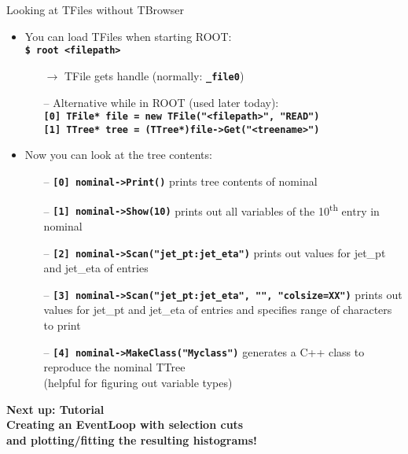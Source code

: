 \documentclass[10pt, aspectratio=169]{beamer}
\begin{document}
\begin{frame}{Looking at TFiles without TBrowser}
  \begin{itemize}
    \item
      You can load TFiles when starting ROOT: \\ \textbf{\texttt{\$ root <filepath>}}
    \begin{itemize}
      \item[$\rightarrow$] TFile gets handle (normally: \textbf{\texttt{\_file0}})
      \item[--] Alternative while in ROOT (used later today): \\ \textbf{\texttt{[0] TFile* file = new TFile("<filepath>", "READ")}} \\ \textbf{\texttt{[1] TTree* tree = (TTree*)file->Get("<treename>")}}
      
    \end{itemize}
    \item
      Now you can look at the tree contents:
    \begin{itemize}
      \item[--] \textbf{\texttt{[0] nominal->Print()}} prints tree contents of nominal
      \item[--] \textbf{\texttt{[1] nominal->Show(10)}} prints out all variables of the 10\textsuperscript{th} entry in nominal
      \item[--] \textbf{\texttt{[2] nominal->Scan("jet\_pt:jet\_eta")}} prints out values for jet\_pt and jet\_eta of entries
       \item[--] \textbf{\texttt{[3] nominal->Scan("jet\_pt:jet\_eta", "", "colsize=XX")}} prints out values for jet\_pt and jet\_eta of entries and specifies range of characters to print
      \item[--] \textbf{\texttt{[4] nominal->MakeClass("Myclass")}} generates a C++ class to reproduce the nominal TTree \\ (helpful for figuring out variable types)
    \end{itemize}
  \end{itemize}
\end{frame}




\begin{frame}

  \begin{center}
    \ugoeAddLogo
    {\color{ugoelogodark}
    \Large\bfseries Next up: Tutorial} \\
    \large\bfseries Creating an EventLoop with selection cuts \\
    and plotting/fitting the resulting histograms!
  \end{center}
\end{frame}
\end{document}
